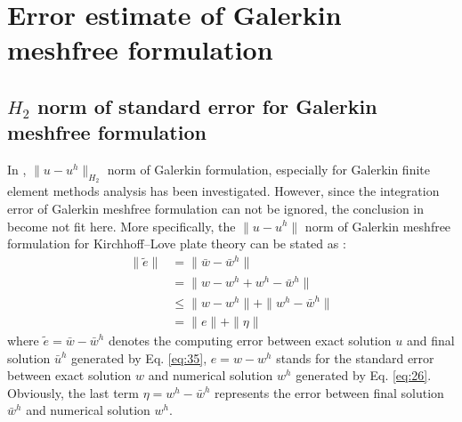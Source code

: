 \section{Error estimate of Galerkin meshfree formulation}\label{sec:error}

\subsection{$H_2$ norm of standard error for Galerkin meshfree formulation}\label{sec:h2standard}

In \cite{ref50}, $\|u-u^{h}\|_{H_2}$ norm of Galerkin formulation, especially for Galerkin finite element methods analysis has been investigated.
However, since the integration error of Galerkin meshfree formulation can not be ignored, the conclusion in \cite{ref50} become not fit here.
More specifically, the $\|u-u^{h}\|$ norm of Galerkin meshfree formulation for Kirchhoff--Love plate theory can be stated as \cite{ref50}:
\begin{equation}\label{eq:46}
\begin{aligned}
\|\tilde{e}\|&=\|\bar{w}-\bar{w}^{h}\|\\
&=\|w-w^{h}+w^{h}-\bar{w}^{h}\|\\
&\le\|w-w^{h}\|+\|w^{h}-\bar{w}^{h}\|\\
&=\|e\|+\|\eta\|
\end{aligned}
\end{equation}
where $\tilde{e}=\bar{w}-\bar{w}^{h}$ denotes the computing error between exact solution $u$ and final solution $\bar{u}^{h}$ generated by Eq. \eqref{eq:35}, $e=w-w^{h}$ stands for the standard error between exact solution $w$ and numerical solution $w^{h}$ generated by Eq. \eqref{eq:26}.
Obviously, the last term $\eta=w^{h}-\bar{w}^{h}$ represents the error between final solution $\bar{w}^{h}$ and numerical solution $w^{h}$.

